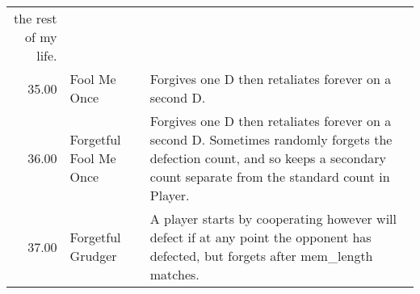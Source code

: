 \begin{tabular}{rll}
	the rest of my life.                                                                                                                                                                                                                                                                                                                                                                                                                                                                                                                                                                                                                                                                                                                                                                                                                                                                                                                        \\
	35.00  & Fool Me Once                & Forgives one D then retaliates forever on a second D.                                                                             \\
	36.00  & Forgetful Fool Me Once      & Forgives one D then retaliates forever on a second D. Sometimes randomly
	forgets the defection count, and so keeps a secondary count separate from
	the standard count in Player.                                                                                                                                                                                                                                                                                                                                                                                                                                                                                                                                                                                                                                                                                                                                                                                                                                 \\
	37.00  & Forgetful Grudger           & A player starts by cooperating however will defect if at any point the
	opponent has defected, but forgets after mem\_length matches.                                                                                                                                                                                                                                                                                                                                                                                                                                                                                                                                                                                                                                                                                                                                                                                                                                                                                  \\

\end{tabular}
